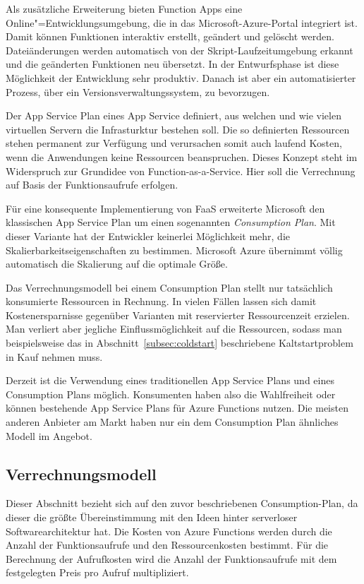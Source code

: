 Als zusätzliche Erweiterung bieten Function Apps eine Online"=Entwicklungsumgebung, die in das Microsoft-Azure-Portal integriert ist. Damit können Funktionen interaktiv erstellt, geändert und gelöscht werden. Dateiänderungen werden automatisch von der Skript-Laufzeitumgebung erkannt und die geänderten Funktionen neu übersetzt. In der Entwurfsphase ist diese Möglichkeit der Entwicklung sehr produktiv. Danach ist aber ein automatisierter Prozess, \zB über ein Versionsverwaltungssystem, zu bevorzugen.

Der App Service Plan eines App Service definiert, aus welchen und wie vielen virtuellen Servern die Infrasturktur bestehen soll. Die so definierten Ressourcen stehen permanent zur Verfügung und verursachen somit auch laufend Kosten, wenn die Anwendungen keine Ressourcen beanspruchen. Dieses Konzept steht im Widerspruch zur Grundidee von Function-as-a-Service. Hier soll die Verrechnung auf Basis der Funktionsaufrufe erfolgen. 

Für eine konsequente Implementierung von FaaS erweiterte Microsoft den klassischen App Service Plan um einen sogenannten \textit{Consumption Plan}. Mit dieser Variante hat der Entwickler keinerlei Möglichkeit mehr, die Skalierbarkeitseigenschaften zu bestimmen. Microsoft Azure übernimmt völlig automatisch die Skalierung auf die optimale Größe.

Das Verrechnungsmodell bei einem Consumption Plan stellt nur tatsächlich konsumierte Ressourcen in Rechnung. In vielen Fällen lassen sich damit Kostenersparnisse gegenüber Varianten mit reservierter Ressourcenzeit erzielen. Man verliert aber jegliche Einflussmöglichkeit auf die Ressourcen, sodass man beispielsweise das in Abschnitt~\ref{subsec:coldstart} beschriebene Kaltstartproblem in Kauf nehmen muss.

Derzeit ist die Verwendung eines traditionellen App Service Plans und eines Consumption Plans möglich. Konsumenten haben also die Wahlfreiheit oder können bestehende App Service Plans für Azure Functions nutzen. Die meisten anderen Anbieter am Markt haben nur ein dem Consumption Plan ähnliches Modell im Angebot.

\subsection{Verrechnungsmodell}

Dieser Abschnitt bezieht sich auf den zuvor beschriebenen Consumption-Plan, da dieser die größte Übereinstimmung mit den Ideen hinter serverloser Softwarearchitektur hat. Die Kosten von Azure Functions werden durch die Anzahl der Funktionsaufrufe und den Ressourcenkosten bestimmt. Für die Berechnung der Aufrufkosten wird die Anzahl der Funktionsaufrufe mit dem festgelegten Preis pro Aufruf multipliziert.

